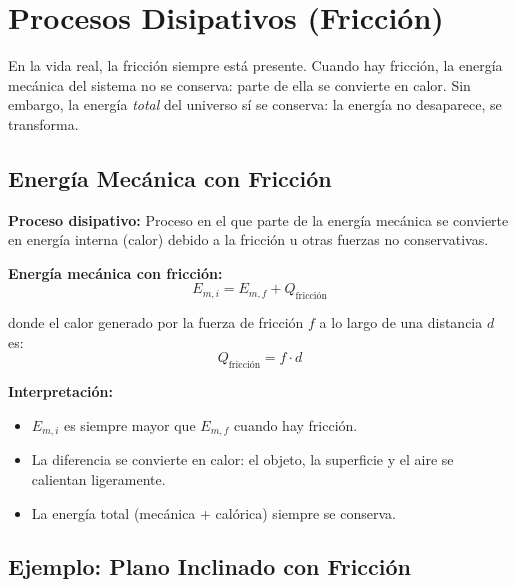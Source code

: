\newpage

\section{Procesos Disipativos (Fricción)}

\begin{seccion}
En la vida real, la fricción siempre está presente. Cuando hay fricción, la energía mecánica del sistema no se conserva: parte de ella se convierte en calor. Sin embargo, la energía \textit{total} del universo sí se conserva: la energía no desaparece, se transforma.
\end{seccion}

\subsection{Energía Mecánica con Fricción}

\begin{seccion}
\begin{definicion}
    \textbf{Proceso disipativo:} Proceso en el que parte de la energía mecánica se convierte en energía interna (calor) debido a la fricción u otras fuerzas no conservativas.
\end{definicion}

\begin{ecuacion}
\textbf{Energía mecánica con fricción:}
$$E_{m,i} = E_{m,f} + Q_{\text{fricción}}$$

donde el calor generado por la fuerza de fricción $f$ a lo largo de una distancia $d$ es:
$$Q_{\text{fricción}} = f \cdot d$$
\end{ecuacion}

\textbf{Interpretación:}
\begin{itemize}
    \item $E_{m,i}$ es siempre mayor que $E_{m,f}$ cuando hay fricción.
    \item La diferencia se convierte en calor: el objeto, la superficie y el aire se calientan ligeramente.
    \item La energía total (mecánica + calórica) siempre se conserva.
\end{itemize}
\end{seccion}

\subsection{Ejemplo: Plano Inclinado con Fricción}

